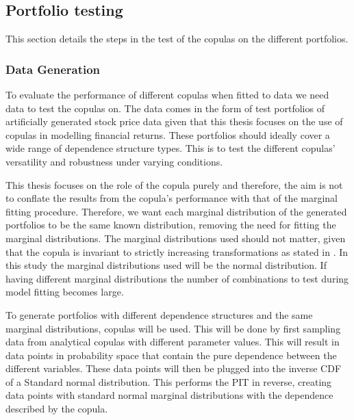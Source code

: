 

\subsection{Portfolio testing}\label{sec:PortfolioTesting}
This section details the steps in the test of the copulas on the different portfolios. 

\subsubsection{Data Generation}
To evaluate the performance of different copulas when fitted to data we need data to test the copulas on. The data comes in the form of test portfolios of artificially generated stock price data given that this thesis focuses on the use of copulas in modelling financial returns. These portfolios should ideally cover a wide range of dependence structure types. This is to test the different copulas' versatility and robustness under varying conditions. 

This thesis focuses on the role of the copula purely and therefore, the aim is not to conflate the results from the copula's performance with that of the marginal fitting procedure. Therefore, we want each marginal distribution of the generated portfolios to be the same known distribution, removing the need for fitting the marginal distributions. The marginal distributions used should not matter, given that the copula is invariant to strictly increasing transformations as stated in . In this study the marginal distributions used will be the normal distribution. If having different marginal distributions the number of combinations to test during model fitting becomes large.  

To generate portfolios with different dependence structures and the same marginal distributions, copulas will be used. This will be done by first sampling data from analytical copulas with different parameter values. This will result in data points in probability space that contain the pure dependence between the different variables. These data points will then be plugged into the inverse \gls{CDF} of a Standard normal distribution. This performs the \gls{PIT} in reverse, creating data points with standard normal marginal distributions with the dependence described by the copula. 

